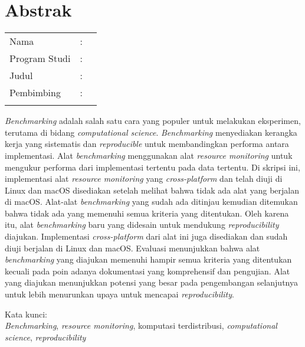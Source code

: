 %
%
%

\chapter*{Abstrak}

\vspace*{0.2cm}
{
	\setlength{\parindent}{0pt}
	
	\begin{tabular}{@{}l l p{10cm}}
		Nama&: & \penulis \\
		Program Studi&: & \program \\
		Judul&: & \judulIndo \\
		Pembimbing&: & \pembimbing \\
				  &  & \pembimbingDua \\
	\end{tabular}

	\bigskip
	\bigskip

	\emph{Benchmarking} adalah salah satu cara yang populer untuk melakukan eksperimen, terutama di bidang \emph{computational science}.
	\emph{Benchmarking} menyediakan kerangka kerja yang sistematis dan \emph{reproducible} untuk membandingkan performa antara implementasi.
	Alat \emph{benchmarking} menggunakan alat \emph{resource monitoring} untuk mengukur performa dari implementasi tertentu pada data tertentu.
	Di skripsi ini, implementasi alat \emph{resource monitoring} yang \emph{cross-platform} dan telah diuji di Linux dan macOS disediakan setelah melihat bahwa tidak ada alat yang berjalan di macOS.
	Alat-alat \emph{benchmarking} yang sudah ada ditinjau kemudian ditemukan bahwa tidak ada yang memenuhi semua kriteria yang ditentukan.
	Oleh karena itu, alat \emph{benchmarking} baru yang didesain untuk mendukung \emph{reproducibility} diajukan.
	Implementasi \emph{cross-platform} dari alat ini juga disediakan dan sudah diuji berjalan di Linux dan macOS.
	Evaluasi menunjukkan bahwa alat \emph{benchmarking} yang diajukan memenuhi hampir semua kriteria yang ditentukan kecuali pada poin adanya dokumentasi yang komprehensif dan pengujian.
	Alat yang diajukan menunjukkan potensi yang besar pada pengembangan selanjutnya untuk lebih menurunkan upaya untuk mencapai \emph{reproducibility}.

	\bigskip

	Kata kunci:\\
	\emph{Benchmarking}, \emph{resource monitoring}, komputasi terdistribusi, \emph{computational science}, \emph{reproducibility}
}

\newpage